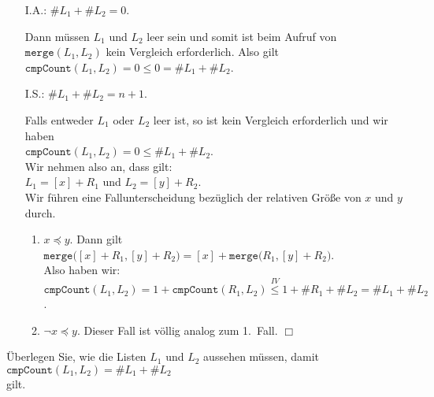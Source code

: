 \begin{enumerate}
\item[I.A.:] $\#L_1 + \#L_2=0$.

             Dann m\"ussen $L_1$ und $L_2$ leer sein und somit ist beim Aufruf
             von $\mathtt{merge}(L_1, L_2)$ kein Vergleich erforderlich.  Also gilt \\[0.2cm]
             \hspace*{1.3cm} $\mathtt{cmpCount}(L_1, L_2) = 0 \leq 0 = \#L_1 + \#L_2$.
\item[I.S.:] $\#L_1 + \#L_2 = n+1$.

             Falls entweder $L_1$ oder $L_2$ leer ist, so ist kein Vergleich erforderlich
             und wir haben 
             \\[0.2cm]
             \hspace*{1.3cm}
             $\mathtt{cmpCount}(L_1,L_2) = 0 \leq \#L_1 + \#L_2$.
             \\[0.2cm]
             Wir nehmen also an, dass gilt: \\[0.2cm]
             \hspace*{1.3cm} $L_1 = [x] + R_1$ \quad und \quad $L_2 = [y] + R_2$.
             \\[0.2cm]
             Wir f\"uhren eine Fallunterscheidung bez\"uglich der relativen Gr\"o{\ss}e von $x$ und $y$ 
             durch.
             \begin{enumerate}
             \item $x \preceq y$.  Dann gilt \\[0.2cm]
                   \hspace*{1.3cm} 
                   $\mathtt{merge}\bigl([x] + R_1, [y] + R_2\bigr) = [x] +
                   \mathtt{merge}\bigl(R_1, [y] + R_2\bigr)$. \\[0.2cm]
                   Also haben wir: \\[0.2cm]
                   \hspace*{1.3cm} 
                   $\mathtt{cmpCount}(L_1, L_2) = 1 + \mathtt{cmpCount}(R_1, L_2) \stackrel{IV}{\leq} 1 + \#R_1 + \#L_2 = \#L_1 + \#L_2$.
             \item $\neg x \preceq y$.  Dieser Fall ist v\"ollig analog zum 1.~Fall. \hspace*{\fill} $\Box$
             \end{enumerate}
\end{enumerate}
\exercise
Überlegen Sie, wie die Listen $L_1$ und $L_2$ aussehen m\"ussen, damit
\\[0.2cm]
\hspace*{1.3cm}
$\mathtt{cmpCount}(L_1, L_2) = \#L_1 + \#L_2$
\\[0.2cm]
gilt.
\vspace*{0.3cm}

